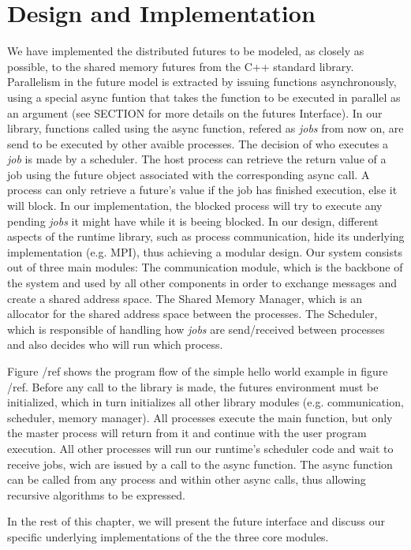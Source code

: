 \chapter{Design and Implementation}

We have implemented the distributed futures to be modeled, as closely as possible, 
to the shared memory futures from the C++ standard library.  Parallelism in the future
model is extracted by issuing functions asynchronously, using a special async funtion
that takes the function to be executed in parallel as an argument (see SECTION for more
details on the futures Interface). In our library, functions called using the async function,
refered as \emph{jobs} from now on, are send to be executed by other avaible processes.  
The decision of who executes a \emph{job} is made by a scheduler.  The host process can retrieve
the return value of a job using the future object associated with the corresponding async call.
A process can only retrieve a future's value if the job has finished execution, else it will block.
In our implementation, the blocked process will try to execute any pending \emph{jobs} it might have
while it is beeing blocked.  In our design, different aspects of the runtime library, such as process
communication, hide its underlying implementation (e.g. MPI),  thus achieving a modular design.
Our system consists out of three main modules: 
The communication module, which is the backbone of the system
and used by all other components in order to exchange messages and create a shared address space. 
The Shared Memory Manager, which is an allocator for the shared address space between the processes.
The Scheduler, which is responsible of handling how \emph{jobs} are send/received between processes
and also decides who will run which process.


Figure /ref shows the program flow of the simple
hello world example in figure /ref.  Before any call to the library is made, the futures
environment must be initialized, which in turn initializes all other library modules 
(e.g. communication, scheduler, memory manager).
All processes execute the main function, but only
the master process will return from it and continue with the user program execution.
All other processes will run our runtime's scheduler code and wait to receive jobs, wich
are issued by a call to the async function.  The async function can be called from any process 
and within other async calls, thus allowing recursive algorithms to be expressed.     


In the rest of this chapter, we will present the future interface and discuss our specific underlying
implementations of the the three core modules.


